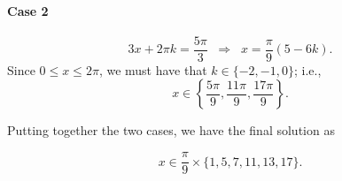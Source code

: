 \documentclass[journal,twoside,web]{ieeecolor}
\begin{document}
\paragraph{Case 2}
\[ 3x + 2\pi k = \frac{5\pi}{3} \;\; \Rightarrow \;\; x = \frac{\pi}{9}( 5 - 6k ). \]
%
Since $0 \leq x \leq 2\pi$, we must have that $k \in \{-2, -1, 0\}$; i.e., 
\[ x \in \left\{ \frac{5\pi}{9}, \frac{11\pi}{9}, \frac{17\pi}{9} \right\}. \]

\noindent Putting together the two cases, we have the final solution as

\[ \boxed{ x \in \frac{\pi}{9} \times \{ 1, 5, 7, 11, 13, 17 \}. } \]

%         
%   

% 
% 
% 
%     
% 
%     
% 
\end{document}
